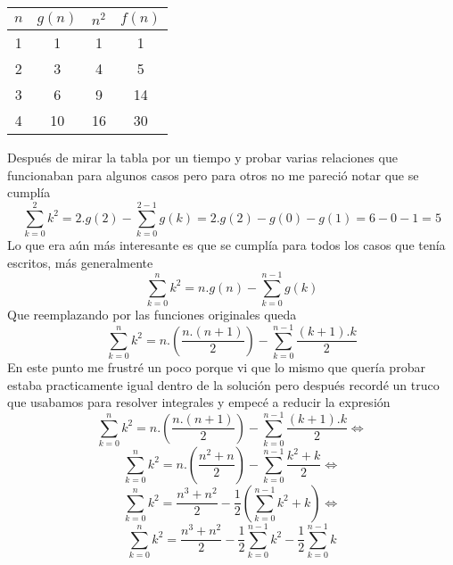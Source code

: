 \documentclass[a4paper,10pt]{article}
\begin{document}
\begin{table}[h]
\begin{center}
\begin{tabular}{|c|c|c|c|}
\hline
$n$ & $g(n)$ & $n^2$ & $f(n)$ \\
\hline
1 & 1 & 1 & 1 \\
\hline
2 & 3 & 4 & 5 \\
\hline
3 & 6 & 9 & 14 \\
\hline
4 & 10 & 16 & 30 \\
\hline
\end{tabular}
\end{center}
\end{table}
Despu\'es de mirar la tabla por un tiempo y probar varias relaciones que
funcionaban para algunos casos pero para otros no me pareci\'o notar que se
cumpl\'ia
\begin{displaymath}
\sum_{k=0}^{2} k^2 = 2.g(2) - \sum_{k=0}^{2-1} g(k) =
2.g(2) - g(0) - g(1) =
6 - 0 - 1 = 5
\end{displaymath}
Lo que era a\'un m\'as interesante es que se cumpl\'ia para todos los casos
que ten\'ia escritos, m\'as generalmente
\begin{equation}
\sum_{k=0}^{n} k^2 = n.g(n) - \sum_{k=0}^{n-1} g(k)
\end{equation}
Que reemplazando por las funciones originales queda
\begin{equation}
\sum_{k=0}^{n} k^2 = n.\left(\frac{n.(n+1)}{2}\right) -
\sum_{k=0}^{n-1} \frac{(k+1).k}{2}
\end{equation}
En este punto me frustr\'e un poco porque vi que lo mismo que quer\'ia
probar estaba practicamente igual dentro de la soluci\'on pero despu\'es
record\'e un truco que usabamos para resolver integrales y empec\'e a
reducir la expresi\'on
\begin{displaymath}
\sum_{k=0}^{n} k^2 = n.\left(\frac{n.(n+1)}{2}\right) -
\sum_{k=0}^{n-1} \frac{(k+1).k}{2} \Longleftrightarrow
\end{displaymath}
\begin{displaymath}
\sum_{k=0}^{n} k^2 = n.\left(\frac{n^2 + n}{2}\right) -
\sum_{k=0}^{n-1} \frac{k^2 + k}{2} \Longleftrightarrow
\end{displaymath}
\begin{displaymath}
\sum_{k=0}^{n} k^2 = \frac{n^3 + n^2}{2} -
\frac{1}{2} \left( \sum_{k=0}^{n-1} k^2 + k \right) \Longleftrightarrow
\end{displaymath}
\begin{displaymath}
\sum_{k=0}^{n} k^2 = \frac{n^3 + n^2}{2} -
\frac{1}{2} \sum_{k=0}^{n-1} k^2 - 
\frac{1}{2} \sum_{k=0}^{n-1} k
\end{displaymath}
\end{document}
